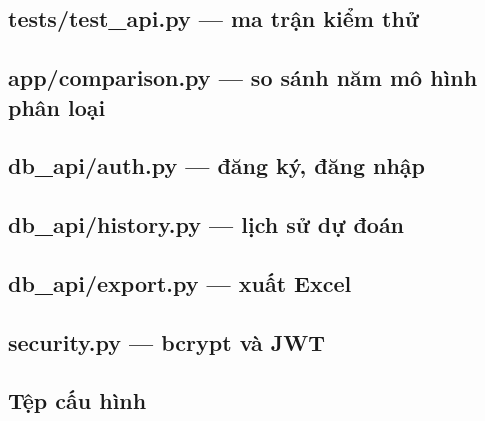 \documentclass[12pt]{article}
\begin{document}
\subsection{tests/test\_api.py --- ma trận kiểm thử}


\subsection{app/comparison.py --- so sánh năm mô hình phân loại}


\subsection{db\_api/auth.py --- đăng ký, đăng nhập}


\subsection{db\_api/history.py --- lịch sử dự đoán}


\subsection{db\_api/export.py --- xuất Excel}


\subsection{security.py --- bcrypt và JWT}


\subsection{Tệp cấu hình}

\end{document}
